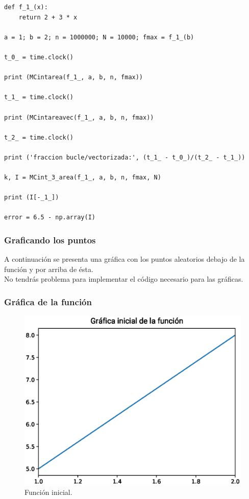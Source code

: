 \begin{frame}
\begin{lstlisting}[caption=Implementación del código, style=FormattedNumber, basicstyle=\linespread{1.1}\ttfamily=\small, columns=fullflexible]
def f_1_(x):
    return 2 + 3 * x

a = 1; b = 2; n = 1000000; N = 10000; fmax = f_1_(b)

t_0_ = time.clock()

print (MCintarea(f_1_, a, b, n, fmax))

t_1_ = time.clock()

print (MCintareavec(f_1_, a, b, n, fmax))

t_2_ = time.clock()

print ('fraccion bucle/vectorizada:', (t_1_ - t_0_)/(t_2_ - t_1_))

k, I = MCint_3_area(f_1_, a, b, n, fmax, N)

print (I[-_1_])

error = 6.5 - np.array(I)
\end{lstlisting}
\end{frame}
\begin{frame}
\frametitle{Graficando los puntos}
A continuación se presenta una gráfica con los puntos aleatorios debajo de la función y por arriba de ésta.
\\
\bigskip
No tendrás problema para implementar el código necesario para las gráficas.
\end{frame}
\begin{frame}
\frametitle{Gráfica de la función}
\begin{figure}
	\centering
	\includegraphics[scale=0.55]{Imagenes/area_puntos_01.eps}
    \caption{Función inicial.}
\end{figure}
\end{frame}
